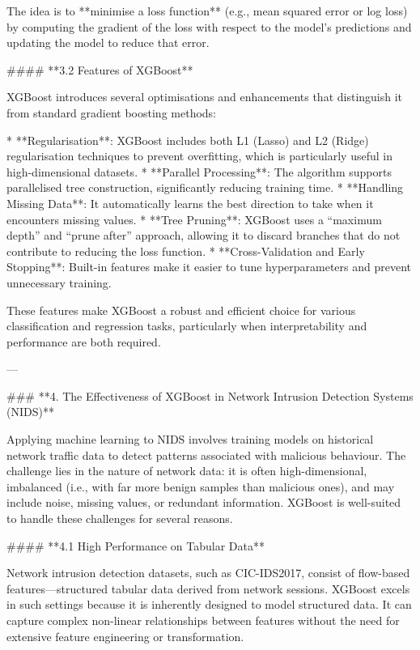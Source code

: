 The idea is to **minimise a loss function** (e.g., mean squared error or log loss) by computing the gradient of the loss with respect to the model’s predictions and updating the model to reduce that error.

#### **3.2 Features of XGBoost**

XGBoost introduces several optimisations and enhancements that distinguish it from standard gradient boosting methods:

* **Regularisation**: XGBoost includes both L1 (Lasso) and L2 (Ridge) regularisation techniques to prevent overfitting, which is particularly useful in high-dimensional datasets.
* **Parallel Processing**: The algorithm supports parallelised tree construction, significantly reducing training time.
* **Handling Missing Data**: It automatically learns the best direction to take when it encounters missing values.
* **Tree Pruning**: XGBoost uses a “maximum depth” and “prune after” approach, allowing it to discard branches that do not contribute to reducing the loss function.
* **Cross-Validation and Early Stopping**: Built-in features make it easier to tune hyperparameters and prevent unnecessary training.

These features make XGBoost a robust and efficient choice for various classification and regression tasks, particularly when interpretability and performance are both required.

---

### **4. The Effectiveness of XGBoost in Network Intrusion Detection Systems (NIDS)**

Applying machine learning to NIDS involves training models on historical network traffic data to detect patterns associated with malicious behaviour. The challenge lies in the nature of network data: it is often high-dimensional, imbalanced (i.e., with far more benign samples than malicious ones), and may include noise, missing values, or redundant information. XGBoost is well-suited to handle these challenges for several reasons.

#### **4.1 High Performance on Tabular Data**

Network intrusion detection datasets, such as CIC-IDS2017, consist of flow-based features—structured tabular data derived from network sessions. XGBoost excels in such settings because it is inherently designed to model structured data. It can capture complex non-linear relationships between features without the need for extensive feature engineering or transformation.

